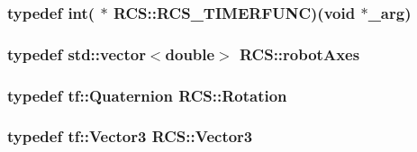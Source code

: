 \hypertarget{namespaceRCS_ae5dd02ab24956844fae02f10de954ad5}{
\subsubsection[{R\-C\-S\-\_\-\-T\-I\-M\-E\-R\-F\-U\-N\-C}]{\setlength{\rightskip}{0pt plus 5cm}typedef int( $\ast$ R\-C\-S\-::\-R\-C\-S\-\_\-\-T\-I\-M\-E\-R\-F\-U\-N\-C)(void $\ast$\-\_\-arg)}}\label{namespaceRCS_ae5dd02ab24956844fae02f10de954ad5}
\hypertarget{namespaceRCS_a3185cefb4d61f5c6f364aaf5624a3ee4}{
\subsubsection[{robot\-Axes}]{\setlength{\rightskip}{0pt plus 5cm}typedef std\-::vector$<$double$>$ {\bf R\-C\-S\-::robot\-Axes}}}\label{namespaceRCS_a3185cefb4d61f5c6f364aaf5624a3ee4}
\hypertarget{namespaceRCS_a3fd915276fdb632d217c560523c320e0}{
\subsubsection[{Rotation}]{\setlength{\rightskip}{0pt plus 5cm}typedef tf\-::\-Quaternion {\bf R\-C\-S\-::\-Rotation}}}\label{namespaceRCS_a3fd915276fdb632d217c560523c320e0}
\hypertarget{namespaceRCS_a688a9db9f1e17b76c410c539997d07a7}{
\subsubsection[{Vector3}]{\setlength{\rightskip}{0pt plus 5cm}typedef tf\-::\-Vector3 {\bf R\-C\-S\-::\-Vector3}}}\label{namespaceRCS_a688a9db9f1e17b76c410c539997d07a7}


